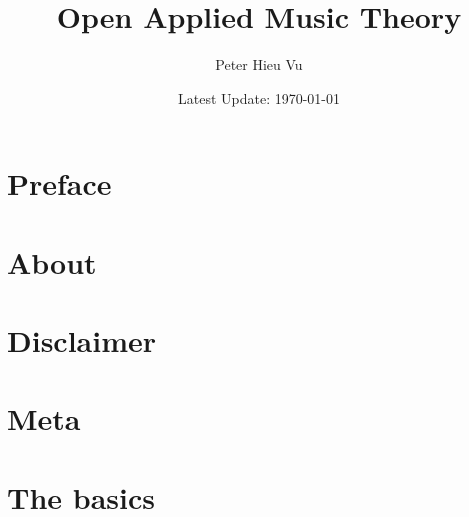\documentclass[12pt]{book}
\title{Open Applied Music Theory}
\author{Peter Hieu Vu}
\date{Latest Update: \today}
\newcommand\onlyinsubfile[1]{#1}
\newcommand\notinsubfile[1]{}
\begin{document}
    \renewcommand{\onlyinsubfile}[1]{}
    \renewcommand{\notinsubfile}[1]{#1}

    \maketitle

    \frontmatter
    \chapter{Preface}\label{preface}
        

    \chapter{About}\label{about}
        

    \tableofcontents

    \chapter{Disclaimer}\label{disclaimer}
        

    \mainmatter 
    \setcounter{chapter}{-1}
    
    \chapter{Meta}\label{ch.0}
        

    \chapter{The basics}\label{ch.1}
        
\end{document}
